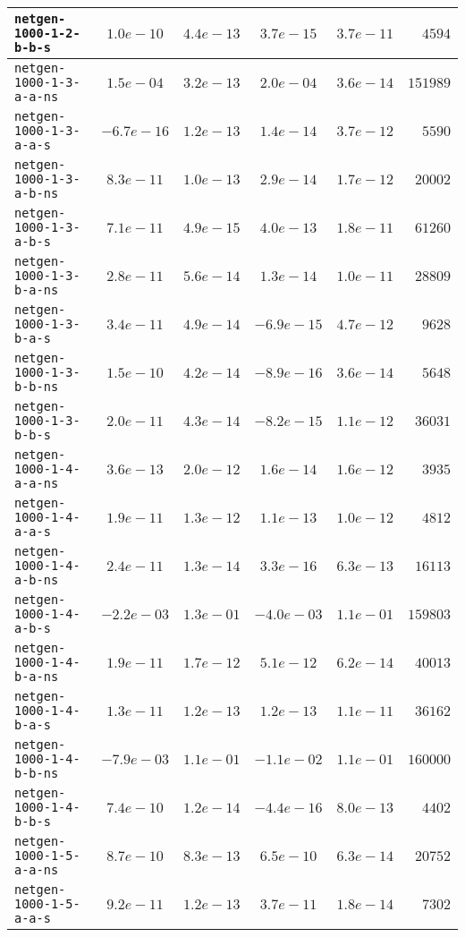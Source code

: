\begin{center}
\begin{longtable}{|l || c | c | c | c | r|}
\hline
\texttt{netgen-1000-1-2-b-b-s} & $1.0e-10$ & $4.4e-13$ & $3.7e-15$ & $3.7e-11$ & $4594$ \\
\hline
\texttt{netgen-1000-1-3-a-a-ns} & $1.5e-04$ & $3.2e-13$ & $2.0e-04$ & $3.6e-14$ & $151989$ \\
\hline
\texttt{netgen-1000-1-3-a-a-s} & $-6.7e-16$ & $1.2e-13$ & $1.4e-14$ & $3.7e-12$ & $5590$ \\
\hline
\texttt{netgen-1000-1-3-a-b-ns} & $8.3e-11$ & $1.0e-13$ & $2.9e-14$ & $1.7e-12$ & $20002$ \\
\hline
\texttt{netgen-1000-1-3-a-b-s} & $7.1e-11$ & $4.9e-15$ & $4.0e-13$ & $1.8e-11$ & $61260$ \\
\hline
\texttt{netgen-1000-1-3-b-a-ns} & $2.8e-11$ & $5.6e-14$ & $1.3e-14$ & $1.0e-11$ & $28809$ \\
\hline
\texttt{netgen-1000-1-3-b-a-s} & $3.4e-11$ & $4.9e-14$ & $-6.9e-15$ & $4.7e-12$ & $9628$ \\
\hline
\texttt{netgen-1000-1-3-b-b-ns} & $1.5e-10$ & $4.2e-14$ & $-8.9e-16$ & $3.6e-14$ & $5648$ \\
\hline
\texttt{netgen-1000-1-3-b-b-s} & $2.0e-11$ & $4.3e-14$ & $-8.2e-15$ & $1.1e-12$ & $36031$ \\
\hline
\texttt{netgen-1000-1-4-a-a-ns} & $3.6e-13$ & $2.0e-12$ & $1.6e-14$ & $1.6e-12$ & $3935$ \\
\hline
\texttt{netgen-1000-1-4-a-a-s} & $1.9e-11$ & $1.3e-12$ & $1.1e-13$ & $1.0e-12$ & $4812$ \\
\hline
\texttt{netgen-1000-1-4-a-b-ns} & $2.4e-11$ & $1.3e-14$ & $3.3e-16$ & $6.3e-13$ & $16113$ \\
\hline
\texttt{netgen-1000-1-4-a-b-s} & $-2.2e-03$ & $1.3e-01$ & $-4.0e-03$ & $1.1e-01$ & $159803$ \\
\hline
\texttt{netgen-1000-1-4-b-a-ns} & $1.9e-11$ & $1.7e-12$ & $5.1e-12$ & $6.2e-14$ & $40013$ \\
\hline
\texttt{netgen-1000-1-4-b-a-s} & $1.3e-11$ & $1.2e-13$ & $1.2e-13$ & $1.1e-11$ & $36162$ \\
\hline
\texttt{netgen-1000-1-4-b-b-ns} & $-7.9e-03$ & $1.1e-01$ & $-1.1e-02$ & $1.1e-01$ & $160000$ \\
\hline
\texttt{netgen-1000-1-4-b-b-s} & $7.4e-10$ & $1.2e-14$ & $-4.4e-16$ & $8.0e-13$ & $4402$ \\
\hline
\texttt{netgen-1000-1-5-a-a-ns} & $8.7e-10$ & $8.3e-13$ & $6.5e-10$ & $6.3e-14$ & $20752$ \\
\hline
\texttt{netgen-1000-1-5-a-a-s} & $9.2e-11$ & $1.2e-13$ & $3.7e-11$ & $1.8e-14$ & $7302$ \\

\end{longtable}
\end{center}

